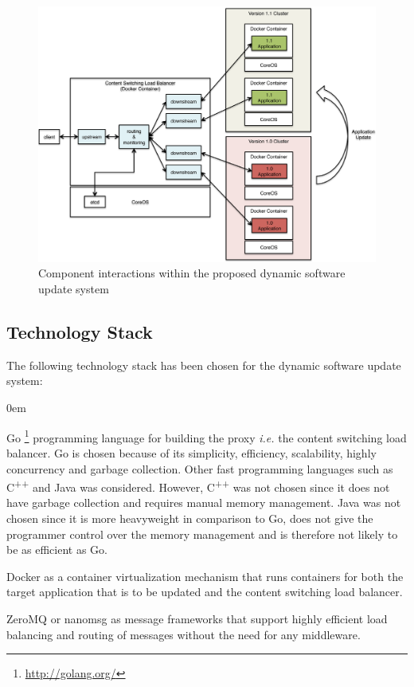 \documentclass[a4paper,11pt,twoside]{article}
\begin{document}
\begin{figure}[!ht]
  \centering
     \includegraphics[scale=0.31]{proposed_solution}
  \caption{Component interactions within the proposed  dynamic software update system}
  \label{proposed_solution}
\end{figure}


\subsection{Technology Stack} 
The following technology stack has been chosen for the dynamic software update system:

\begin{list}{-}{}
  \itemsep0em
  \item Go \footnote{\url{http://golang.org/}} programming language for building the proxy \textit{i.e.} the content switching load balancer. Go is chosen because of its simplicity, efficiency, scalability, highly concurrency and garbage collection. Other fast programming languages such as C\textsuperscript{++} and Java was considered. However, C\textsuperscript{++} was not chosen since it does not have garbage collection and requires manual memory management. Java was not chosen since it is more heavyweight in comparison to Go, does not give the programmer control over the memory management and is therefore not likely to be as efficient as Go.
    
  \item Docker as a container virtualization mechanism that runs containers for both the target application that is to be updated and the content switching load balancer.
  
  \item ZeroMQ or nanomsg as message frameworks that support highly efficient load balancing and routing of messages without the need for any middleware.

    \end{list}
\end{document}
